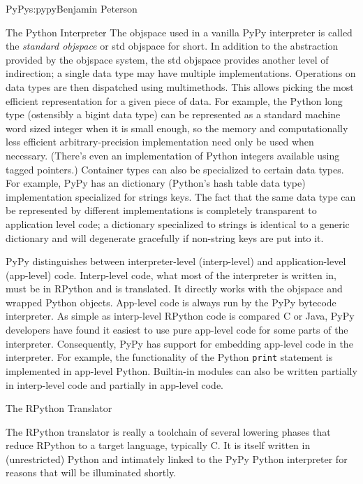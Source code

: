 \begin{aosachapter}{PyPy}{s:pypy}{Benjamin Peterson}
\begin{aosasect1}{The Python Interpreter}
The objspace used in a vanilla PyPy interpreter is called the \emph{standard
  objspace} or std objspace for short. In addition to the abstraction provided
by the objspace system, the std objspace provides another level of indirection;
a single data type may have multiple implementations. Operations on data types
are then dispatched using multimethods. This allows picking the most efficient
representation for a given piece of data. For example, the Python long type
(ostensibly a bigint data type) can be represented as a standard machine word
sized integer when it is small enough, so the memory and computationally less
efficient arbitrary-precision implementation need only be used when
necessary. (There's even an implementation of Python integers available using
tagged pointers.) Container types can also be specialized to certain data
types. For example, PyPy has an dictionary (Python's hash table data type)
implementation specialized for strings keys. The fact that the same data type
can be represented by different implementations is completely transparent to
application level code; a dictionary specialized to strings is identical to a
generic dictionary and will degenerate gracefully if non-string keys are put
into it.

PyPy distinguishes between interpreter-level (interp-level) and
application-level (app-level) code. Interp-level code, what most of the
interpreter is written in, must be in RPython and is translated. It directly
works with the objspace and wrapped Python objects. App-level code is always run
by the PyPy bytecode interpreter. As simple as interp-level RPython code is
compared C or Java, PyPy developers have found it easiest to use pure app-level
code for some parts of the interpreter. Consequently, PyPy has support for
embedding app-level code in the interpreter. For example, the functionality of
the Python \verb+print+ statement is implemented in app-level Python. Builtin-in
modules can also be written partially in interp-level code and partially in
app-level code.

\end{aosasect1}

\begin{aosasect1}{The RPython Translator}
\label{sec:translator}

The RPython translator is really a toolchain of several lowering phases that
reduce RPython to a target language, typically C. It is itself written in
(unrestricted) Python and intimately linked to the PyPy Python interpreter for
reasons that will be illuminated shortly.


\end{aosasect1}
\end{aosachapter}
